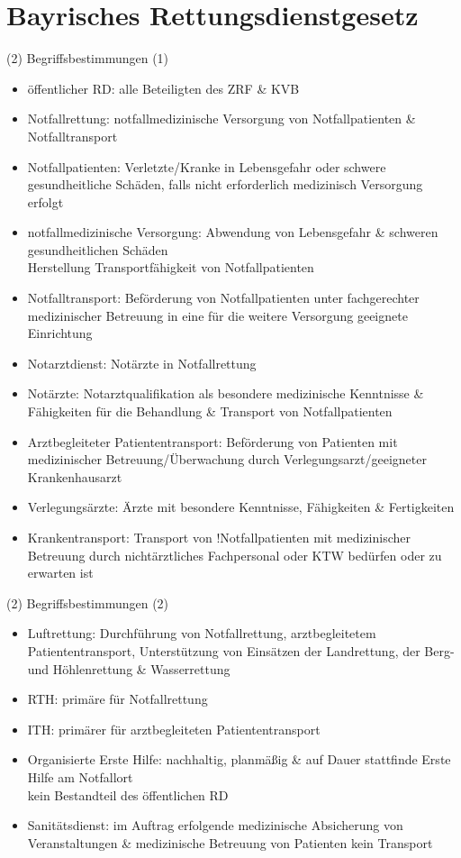 \section{Bayrisches Rettungsdienstgesetz}
\begin{sectionbox}{(2) Begriffsbestimmungen (1)}
    \begin{itemize}
        \item öffentlicher RD: alle Beteiligten des ZRF \& KVB
        \item Notfallrettung: notfallmedizinische Versorgung von Notfallpatienten \& Notfalltransport
        \item Notfallpatienten: Verletzte/Kranke in Lebensgefahr oder schwere gesundheitliche Schäden, falls nicht erforderlich medizinisch Versorgung erfolgt 
        \item notfallmedizinische Versorgung: Abwendung von Lebensgefahr \& schweren gesundheitlichen Schäden\\
        \ra Herstellung Transportfähigkeit von Notfallpatienten
        \item Notfalltransport: Beförderung von Notfallpatienten unter fachgerechter medizinischer Betreuung in eine für die weitere Versorgung geeignete Einrichtung
        \item Notarztdienst: Notärzte in Notfallrettung
        \item Notärzte: Notarztqualifikation als besondere medizinische Kenntnisse \& Fähigkeiten für die Behandlung \& Transport von Notfallpatienten
        \item Arztbegleiteter Patiententransport: Beförderung von Patienten mit medizinischer Betreuung/Überwachung durch Verlegungsarzt/geeigneter Krankenhausarzt
        \item Verlegungsärzte: Ärzte mit besondere Kenntnisse, Fähigkeiten \& Fertigkeiten
        \item Krankentransport: Transport von !Notfallpatienten mit medizinischer Betreuung durch nichtärztliches Fachpersonal oder KTW bedürfen oder zu erwarten ist
    \end{itemize}
\end{sectionbox}
\begin{sectionbox}{(2) Begriffsbestimmungen (2)}
    \begin{itemize}
        \item Luftrettung: Durchführung von Notfallrettung, arztbegleitetem Patiententransport, Unterstützung von Einsätzen der Landrettung, der Berg- und Höhlenrettung \& Wasserrettung
        \item RTH: primäre für Notfallrettung
        \item ITH: primärer für arztbegleiteten Patiententransport 
        \item Organisierte Erste Hilfe: nachhaltig, planmäßig \& auf Dauer stattfinde Erste Hilfe am Notfallort\\
        \ra kein Bestandteil des öffentlichen RD
        \item Sanitätsdienst: im Auftrag erfolgende medizinische Absicherung von Veranstaltungen \& medizinische Betreuung von Patienten \ra kein Transport
    \end{itemize}
\end{sectionbox}

